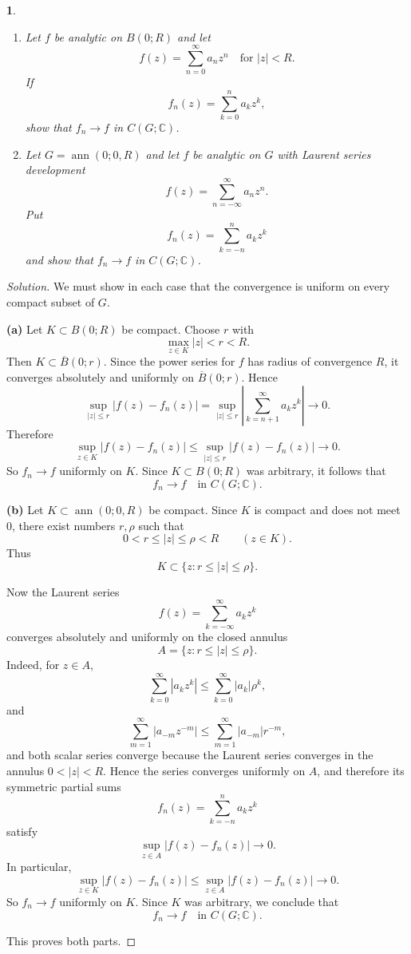 \documentclass[12pt, a4paper]{report}
\theoremstyle{spaced}
\newtheorem{exercise}{}
\begin{document}
\begin{exercise}
	\begin{enumerate}[label=(\alph*)]
		\item Let $f$ be analytic on $B(0;R)$ and let
		      \[
			      f(z)=\sum_{n=0}^{\infty} a_n z^n \quad \text{for } |z|<R.
		      \]
		      If
		      \[
			      f_n(z)=\sum_{k=0}^{n} a_k z^k,
		      \]
		      show that $f_n\to f$ in $C(G;\mathbb{C})$.

		\item Let $G=\operatorname{ann}(0;0,R)$ and let $f$ be analytic on $G$ with Laurent series development
		      \[
			      f(z)=\sum_{n=-\infty}^{\infty} a_n z^n.
		      \]
		      Put
		      \[
			      f_n(z)=\sum_{k=-n}^{n} a_k z^k
		      \]
		      and show that $f_n\to f$ in $C(G;\mathbb{C})$.
	\end{enumerate}
\end{exercise}

\begin{proof}[Solution]
	We must show in each case that the convergence is uniform on every compact subset of \(G\).

	\medskip
	\textbf{(a)} Let \(K\subset B(0;R)\) be compact. Choose \(r\) with
	\[
		\max_{z\in K}|z|<r<R.
	\]
	Then \(K\subset \overline{B}(0;r)\). Since the power series for \(f\) has radius of convergence \(R\), it converges absolutely and uniformly on \(\overline{B}(0;r)\). Hence
	\[
		\sup_{|z|\le r}\left|f(z)-f_n(z)\right|
		=
		\sup_{|z|\le r}\left|\sum_{k=n+1}^\infty a_k z^k\right|
		\to 0.
	\]
	Therefore
	\[
		\sup_{z\in K}|f(z)-f_n(z)|
		\le
		\sup_{|z|\le r}|f(z)-f_n(z)|
		\to 0.
	\]
	So \(f_n\to f\) uniformly on \(K\). Since \(K\subset B(0;R)\) was arbitrary, it follows that
	\[
		f_n\to f \quad \text{in } C(G;\mathbb C).
	\]

	\medskip
	\textbf{(b)} Let \(K\subset \operatorname{ann}(0;0,R)\) be compact. Since \(K\) is compact and does not meet \(0\), there exist numbers \(r,\rho\) such that
	\[
		0<r\le |z|\le \rho<R \qquad (z\in K).
	\]
	Thus
	\[
		K\subset \{z: r\le |z|\le \rho\}.
	\]

	Now the Laurent series
	\[
		f(z)=\sum_{k=-\infty}^{\infty} a_k z^k
	\]
	converges absolutely and uniformly on the closed annulus
	\[
		A=\{z: r\le |z|\le \rho\}.
	\]
	Indeed, for \(z\in A\),
	\[
		\sum_{k=0}^\infty |a_k z^k|
		\le \sum_{k=0}^\infty |a_k|\rho^k,
	\]
	and
	\[
		\sum_{m=1}^\infty |a_{-m} z^{-m}|
		\le \sum_{m=1}^\infty |a_{-m}|r^{-m},
	\]
	and both scalar series converge because the Laurent series converges in the annulus \(0<|z|<R\). Hence the series converges uniformly on \(A\), and therefore its symmetric partial sums
	\[
		f_n(z)=\sum_{k=-n}^{n} a_k z^k
	\]
	satisfy
	\[
		\sup_{z\in A}|f(z)-f_n(z)|\to 0.
	\]
	In particular,
	\[
		\sup_{z\in K}|f(z)-f_n(z)|
		\le
		\sup_{z\in A}|f(z)-f_n(z)|
		\to 0.
	\]
	So \(f_n\to f\) uniformly on \(K\). Since \(K\) was arbitrary, we conclude that
	\[
		f_n\to f \quad \text{in } C(G;\mathbb C).
	\]

	This proves both parts.
\end{proof}
\end{document}
